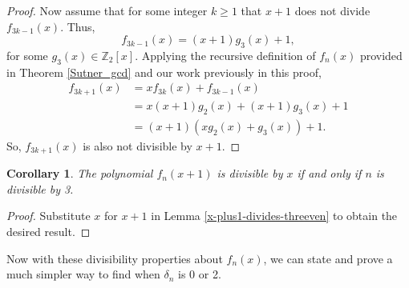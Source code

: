 \documentclass[a4paper]{article}
\newtheorem{corollary}{Corollary}
\newcommand{\Z}{\mathbb{Z}}
\begin{document}
\begin{proof}
		Now assume that for some integer $k \geq 1$ that $x+1$ does not divide $f_{3k-1}(x)$.
		Thus,
		\begin{equation*}
			f_{3k-1}(x) = (x+1)g_3(x) + 1,
		\end{equation*}
		for some $g_3(x) \in \Z_2[x]$.
		Applying the recursive definition of $f_n(x)$ provided in Theorem \ref{Sutner_gcd} and our work previously in this proof,
		\begin{align*}
			f_{3k+1}(x) &= xf_{3k}(x) + f_{3k-1}(x) \\
				&= x(x+1)g_2(x) + (x+1)g_3(x) + 1 \\
				&= (x+1)\left(xg_2(x) + g_3(x)\right) + 1.
		\end{align*}
		So, $f_{3k+1}(x)$ is also not divisible by $x+1$.
	\end{proof}

	\begin{corollary}\label{x-divides-threeven}
		The polynomial $f_n(x+1)$ is divisible by $x$ if and only if $n$ is divisible by 3.
	\end{corollary}
	\begin{proof}
		Substitute $x$ for $x+1$ in Lemma \ref{x-plus1-divides-threeven} to obtain the desired result.
	\end{proof}
	
	Now with these divisibility properties about $f_n(x)$, we can state and prove a much simpler way to find when $\delta_n$ is 0 or 2.
	
\end{document}
